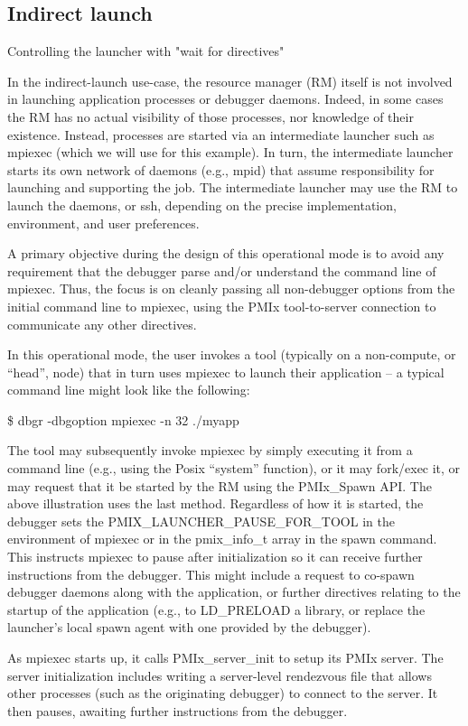 \subsection{Indirect launch}


Controlling the launcher with "wait for directives"

In the indirect-launch use-case, the resource manager (RM) itself is not involved in launching application processes or debugger daemons. Indeed, in some cases the RM has no actual visibility of those processes, nor knowledge of their existence. Instead, processes are started via an intermediate launcher such as mpiexec (which we will use for this example). In turn, the intermediate launcher starts its own network of daemons (e.g., mpid) that assume responsibility for launching and supporting the job. The intermediate launcher may use the RM to launch the daemons, or ssh, depending on the precise implementation, environment, and user preferences.

A primary objective during the design of this operational mode is to avoid any requirement that the debugger parse and/or understand the command line of mpiexec. Thus, the focus is on cleanly passing all non-debugger options from the initial command line to mpiexec, using the PMIx tool-to-server connection to communicate any other directives.

In this operational mode, the user invokes a tool (typically on a non-compute, or “head”, node) that in turn uses mpiexec to launch their application – a typical command line might look like the following:


\$ dbgr -dbgoption mpiexec -n 32 ./myapp

The tool may subsequently invoke mpiexec by simply executing it from a command line (e.g., using the Posix “system” function), or it may fork/exec it, or may request that it be started by the RM using the PMIx_Spawn API. The above illustration uses the last method. Regardless of how it is started, the debugger sets the PMIX_LAUNCHER_PAUSE_FOR_TOOL in the environment of mpiexec or in the pmix_info_t array in the spawn command. This instructs mpiexec to pause after initialization so it can receive further instructions from the debugger. This might include a request to co-spawn debugger daemons along with the application, or further directives relating to the startup of the application (e.g., to LD_PRELOAD a library, or replace the launcher’s local spawn agent with one provided by the debugger).

As mpiexec starts up, it calls PMIx_server_init to setup its PMIx server. The server initialization includes writing a server-level rendezvous file that allows other processes (such as the originating debugger) to connect to the server. It then pauses, awaiting further instructions from the debugger.

